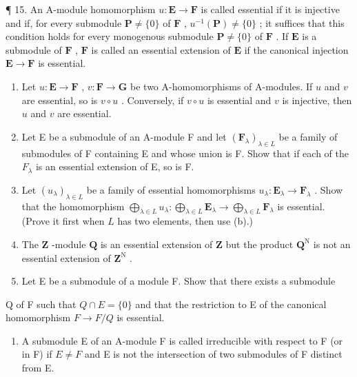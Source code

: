¶ 15. An A-module homomorphism \(u: \mathbf{E} \to \mathbf{F}\) is called essential if it is injective and if, for every submodule \(\mathbf{P} \neq \{0\}\) of \(\mathbf{F}\) , \(u^{-1}(\mathbf{P}) \neq \{0\}\) ; it suffices that this condition holds for every monogenous submodule \(\mathbf{P} \neq \{0\}\) of \(\mathbf{F}\) . If \(\mathbf{E}\) is a submodule of \(\mathbf{F}\) , \(\mathbf{F}\) is called an essential extension of \(\mathbf{E}\) if the canonical injection \(\mathbf{E} \to \mathbf{F}\) is essential.

\begin{enumerate}
\def\labelenumi{(\alph{enumi})}
\item
  Let \(u: \mathbf{E} \to \mathbf{F}\) , \(v: \mathbf{F} \to \mathbf{G}\) be two A-homomorphisms of A-modules. If \(u\) and \(v\) are essential, so is \(v \circ u\) . Conversely, if \(v \circ u\) is essential and \(v\) is injective, then \(u\) and \(v\) are essential.
\item
  Let E be a submodule of an A-module F and let \((\mathbf{F}_{\lambda})_{\lambda \in L}\) be a family of submodules of F containing E and whose union is F. Show that if each of the \(F_{\lambda}\) is an essential extension of E, so is F.
\item
  Let \((u_{\lambda})_{\lambda \in L}\) be a family of essential homomorphisms \(u_{\lambda} \colon \mathbf{E}_{\lambda} \to \mathbf{F}_{\lambda}\) . Show that the homomorphism \(\bigoplus_{\lambda \in L} u_{\lambda} \colon \bigoplus_{\lambda \in L} \mathbf{E}_{\lambda} \to \bigoplus_{\lambda \in L} \mathbf{F}_{\lambda}\) is essential. (Prove it first when \(L\) has two elements, then use (b).)
\item
  The \(\mathbf{Z}\) -module \(\mathbf{Q}\) is an essential extension of \(\mathbf{Z}\) but the product \(\mathbf{Q}^{\mathrm{N}}\) is not an essential extension of \(\mathbf{Z}^{\mathrm{N}}\) .
\item
  Let E be a submodule of a module F. Show that there exists a submodule
\end{enumerate}

Q of F such that \(Q \cap E = \{0\}\) and that the restriction to E of the canonical homomorphism \(F \to F/Q\) is essential.

\begin{enumerate}
\def\labelenumi{\arabic{enumi}.}
\setcounter{enumi}{15}
\tightlist
\item
  A submodule E of an A-module F is called irreducible with respect to F (or in F) if \(E \neq F\) and E is not the intersection of two submodules of F distinct from E.
\end{enumerate}

